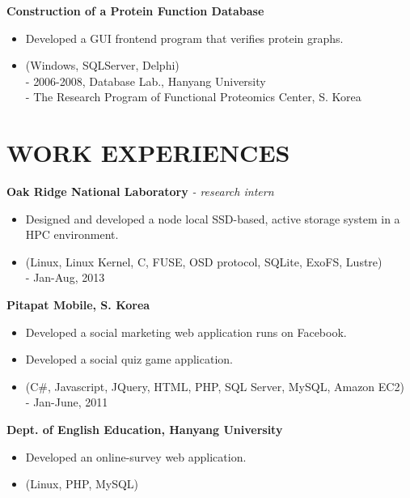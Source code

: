 \documentclass{res}
\begin{document}
\begin{resume}
   {\bf Construction of a Protein Function Database} 
        \begin{itemize}
        \item[] 
        Developed a GUI frontend program that verifies protein graphs.
        \item[] (Windows, SQLServer, Delphi)
	\vspace{0.05in}\\
	- {\small 2006-2008, Database Lab., Hanyang University}\\
	- {\small The Research Program of Functional Proteomics Center, S.
	Korea}
       \end{itemize} 
 
\section{WORK EXPERIENCES} 
\vspace{0.1in} 
{\bf Oak Ridge National Laboratory} {\it - research intern}
      \begin{itemize}
      \item[] Designed and developed a node local SSD-based, active storage system in a HPC
	      environment.
      \item[] (Linux, Linux Kernel, C, FUSE, OSD protocol, SQLite, ExoFS, Lustre)
      \vspace{0.05in}\\
      - {\small Jan-Aug, 2013}
      \end{itemize}
   {\bf Pitapat Mobile, S. Korea}
      \begin{itemize}
      \item[] Developed a social marketing web application runs on Facebook.
      \vspace{-0.07in}
      \item[] Developed a social quiz game application.
      \item[] (C\#, Javascript, JQuery, HTML, PHP, SQL Server, MySQL, Amazon EC2)
      \vspace{0.05in}\\
      - {\small Jan-June, 2011}
      \end{itemize}
   {\bf Dept. of English Education, Hanyang University}
      \begin{itemize}
      \item[] Developed an online-survey web application.
      \item[] (Linux, PHP, MySQL)
      \vspace{0.05in}\\

\end{itemize}
\end{resume}
\end{document}

